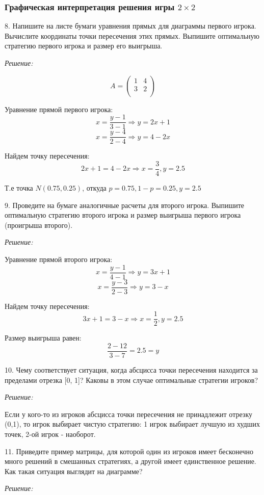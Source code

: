 \documentclass[aps,%
12pt,%
final,%
oneside,
onecolumn,%
musixtex, %
superscriptaddress,%
centertags]{article} %
\begin{document}
\subsubsection{Графическая интерпретация решения игры $2 \times 2$}

8. Напишите на листе бумаги уравнения прямых для диаграммы первого игрока. Вычислите координаты точки пересечения этих прямых. Выпишите оптимальную стратегию первого игрока и размер его выигрыша.

\textit{Решение:}

$$A = 
\begin{pmatrix}
1 & 4 \\
3 & 2 \\
\end{pmatrix}
$$

Уравнение прямой первого игрока:
$$ x  = \frac{y-1}{3-1} \Rightarrow y = 2x+1$$
$$ x =\frac{y-4}{2-4} \Rightarrow y = 4-2x$$

Найдем точку пересечения:
$$2x+1 = 4-2x \Rightarrow x = \frac{3}{4}, y = 2.5$$

Т.е точка $N(0.75,0.25)$, откуда $p = 0.75, 1-p=0.25, y = 2.5$

9.  Проведите на бумаге аналогичные расчеты для второго игрока. Выпишите оптимальную стратегию второго игрока и размер выигрыша первого игрока (проигрыша второго).

\textit{Решение:}

Уравнение прямой второго игрока:
$$ x = \frac{y-1}{4-1} \Rightarrow y =3x +1  $$
$$ x = \frac{y-3}{2-3} \Rightarrow y = 3-x $$

Найдем точку пересечения:
$$3x +1 = 3-x \Rightarrow x = \frac{1}{2}, y = 2.5$$

Размер выигрыша равен: $$\frac{2-12}{3-7} = 2.5 = y $$

10. Чему соответствует ситуация, когда абсцисса точки пересечения находится за пределами отрезка [0, 1]? Каковы в этом случае оптимальные стратегии игроков?

\textit{Решение:}

Если у кого-то из игроков абсцисса точки пересечения не принадлежит отрезку (0,1), то игрок выбирает чистую стратегию: 1 игрок выбирает лучшую из худших точек, 2-ой игрок - наоборот.

11. Приведите пример матрицы, для которой один из игроков имеет бесконечно много решений в смешанных стратегиях, а другой имеет единственное решение. Как такая ситуация выглядит на диаграмме?

\textit{Решение:}
\end{document}
